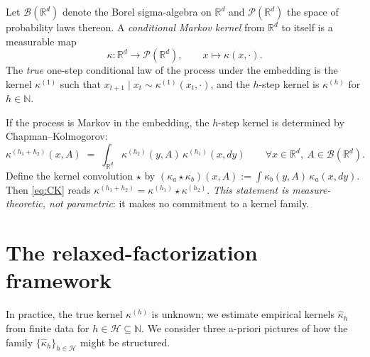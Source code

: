 \documentclass[11pt]{article}
\newcommand{\Rb}{\mathbb{R}}
\newcommand{\Nb}{\mathbb{N}}
\newcommand{\Hcal}{\mathcal{H}}
\newcommand{\Pcal}{\mathcal{P}}
\newcommand{\Bcal}{\mathcal{B}}
\newcommand{\compose}{\star}
\theoremstyle{definition}
\theoremstyle{plain}
\begin{document}
Let $\Bcal(\Rb^d)$ denote the Borel sigma-algebra on $\Rb^d$ and
$\Pcal(\Rb^d)$ the space of probability laws thereon. A
\emph{conditional Markov kernel} from $\Rb^d$ to itself is a
measurable map
\[
  \kappa : \Rb^d \to \Pcal(\Rb^d),
  \qquad x \mapsto \kappa(x, \cdot).
\]
The \emph{true} one-step conditional law of the process under the
embedding is the kernel $\kappa^{(1)}$ such that
$x_{t+1} \mid x_t \sim \kappa^{(1)}(x_t, \cdot)$, and the
$h$-step kernel is $\kappa^{(h)}$ for $h \in \Nb$.

If the process is Markov in the embedding, the $h$-step kernel is
determined by Chapman--Kolmogorov:
\begin{equation}
  \label{eq:CK}
  \kappa^{(h_1 + h_2)}(x, A) \;=\;
  \int_{\Rb^d} \kappa^{(h_2)}(y, A)\, \kappa^{(h_1)}(x, dy)
  \qquad \forall x \in \Rb^d,\ A \in \Bcal(\Rb^d).
\end{equation}
Define the kernel convolution $\compose$ by
$(\kappa_a \compose \kappa_b)(x, A) := \int \kappa_b(y, A)\,
\kappa_a(x, dy)$. Then \eqref{eq:CK} reads
$\kappa^{(h_1 + h_2)} = \kappa^{(h_1)} \compose \kappa^{(h_2)}$.
\emph{This statement is measure-theoretic, not parametric}: it
makes no commitment to a kernel family.

\section{The relaxed-factorization framework}
\label{sec:framework}

In practice, the true kernel $\kappa^{(h)}$ is unknown; we
estimate empirical kernels $\hat\kappa_h$ from finite data for
$h \in \Hcal \subseteq \Nb$. We consider three a-priori pictures of
how the family $\{\hat\kappa_h\}_{h \in \Hcal}$ might be structured.
\end{document}
